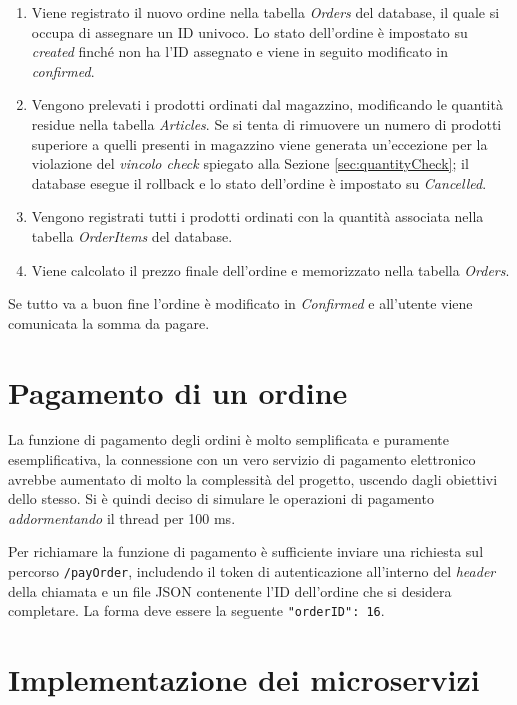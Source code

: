 	\begin{enumerate}
		\item Viene registrato il nuovo ordine nella tabella \emph{Orders} del database, il quale si occupa di assegnare un ID univoco.
		Lo stato dell'ordine è impostato su \emph{created} finché non ha l'ID assegnato e viene in seguito modificato in \emph{confirmed}.
		
		\item Vengono prelevati i prodotti ordinati dal magazzino, modificando le quantità residue nella tabella \emph{Articles}.
		Se si tenta di rimuovere un numero di prodotti superiore a quelli presenti in magazzino viene generata un'eccezione per la violazione del \emph{vincolo check} spiegato alla Sezione \ref{sec:quantityCheck};
		il database esegue il rollback e lo stato dell'ordine è impostato su \emph{Cancelled}.
		
		\item Vengono registrati tutti i prodotti ordinati con la quantità associata nella tabella \emph{OrderItems} del database.
		
		\item Viene calcolato il prezzo finale dell'ordine e memorizzato nella tabella \emph{Orders}.
	\end{enumerate}
	
	Se tutto va a buon fine l'ordine è modificato in \emph{Confirmed} e all'utente viene comunicata la somma da pagare.
	

	
\section{Pagamento di un ordine}

	La funzione di pagamento degli ordini è molto semplificata e puramente esemplificativa, la connessione con un vero servizio di pagamento elettronico avrebbe aumentato di molto la complessità del progetto, uscendo dagli obiettivi dello stesso.
	Si è quindi deciso di simulare le operazioni di pagamento \emph{addormentando} il thread per 100 ms.
	
	Per richiamare la funzione di pagamento è sufficiente inviare una richiesta sul percorso \texttt{/payOrder}, includendo il token di autenticazione all'interno del \emph{header} della chiamata e un file JSON contenente l'ID dell'ordine che si desidera completare.
	La forma deve essere la seguente \texttt{{"orderID": 16}}.


	
\section{Implementazione dei microservizi}

